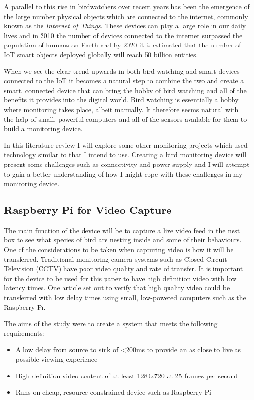 \documentclass[10pt,a4paper]{article}
\begin{document}
A parallel to this rise in birdwatchers over recent years has been the emergence of the large number physical objects which are connected to the internet, commonly known as the \textit{Internet of Things}. These devices can play a large role in our daily lives and in 2010 the number of devices connected to the internet surpassed the population of humans on Earth\cite{AlFuqaha2015} and by 2020 it is estimated that the number of IoT smart objects deployed globally will reach 50 billion entities\cite{Arumuga2017}. 

When we see the clear trend upwards in both bird watching and smart devices connected to the IoT it becomes a natural step to combine the two and create a smart, connected device that can bring the hobby of bird watching and all of the benefits it provides into the digital world. Bird watching is essentially a hobby where monitoring takes place, albeit manually. It therefore seems natural with the help of small, powerful computers and all of the sensors available for them to build a monitoring device. 

In this literature review I will explore some other monitoring projects which used technology similar to that I intend to use. Creating a bird monitoring device will present some challenges such as connectivity and power supply and I will attempt to gain a better understanding of how I might cope with these challenges in my monitoring device.
\subsection{Raspberry Pi for Video Capture}
The main function of the device will be to capture a live video feed in the nest box to see what species of bird are nesting inside and some of their behaviours. One of the considerations to be taken when capturing video is how it will be transferred. Traditional monitoring camera systems such as Closed Circuit Television (CCTV) have poor video quality and rate of transfer. It is important for the device to be used for this paper to have high definition video with low latency times. One article\cite{Jennehag2016} set out to verify that high quality video could be transferred with low delay times using small, low-powered computers such as the Raspberry Pi. 

The aims of the study were to create a system that meets the following requirements:
\begin{itemize}
\item A low delay from source to sink of \textless200ms to provide an as close to live as possible viewing experience
\item High definition video content of at least 1280x720 at 25 frames per second
\item Runs on cheap, resource-constrained device such as Raspberry Pi
\end{itemize}
\end{document}

